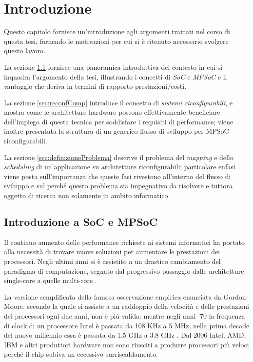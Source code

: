 \chapter{Introduzione}
\label{chap:intro}
\vspace{1cm}
Questo capitolo fornisce un'introduzione agli argomenti trattati nel corso di questa
tesi, fornendo le motivazioni per cui si \`e ritenuto necessario svolgere questo
lavoro.

La sezione \ref{sec:introSoC} fornisce una panoramica introduttiva del contesto in cui si
inquadra l'argomento della tesi, illustrando i concetti di \emph{\acl{SoC}} e
\emph{\acl{MPSoC}} e il vantaggio che deriva in termini di rapporto prestazioni/costi.

La sezione \ref{sec:reconfComp} introduce il concetto di \emph{sistemi riconfigurabili},
e mostra come le architetture hardware possono effettivamente beneficiare dell'impiego
di questa tecnica per soddisfare i requisiti di performance; viene inoltre presentata
la struttura di un generico flusso di sviluppo per \acs{MPSoC} riconfigurabili.

La sezione \ref{sec:definizioneProblema} descrive il problema del \emph{mapping} e dello
\emph{scheduling} di un'applicazione su architetture riconfigurabili; particolare
enfasi viene posta sull'importanza che queste fasi rivestono all'interno del
flusso di sviluppo e sul perch\'e questo problema sia impegnativo da risolvere
e tuttora oggetto di ricerca non solamente in ambito informatico.

\newpage

\section[Introduzione a \acs{SoC} e \ac{MPSoC}]{Introduzione a \acs{SoC} e \ac{MPSoC}}
\label{sec:introSoC}
Il continuo aumento delle performance richieste ai sistemi informatici ha portato alla necessit\`a
di trovare nuove soluzioni per aumentare le prestazioni dei processori. Negli ultimi anni si \`e
assistito a un drastico cambiamento del paradigma di computazione, segnato dal progressivo passaggio
dalle architetture single-core a quelle multi-core \cite{SingleCoreToMultiCore}.

La versione semplificata della famosa osservazione empirica enunciata da Gordon Moore, secondo la quale
si assiste a un raddoppio della velocit\`a e delle prestazioni dei processori ogni due anni, non \`e
pi\`u valida: mentre negli anni '70 la frequenza di clock di un processore Intel \`e passata da 108 KHz a
5 MHz, nella prima decade del nuovo millennio essa \`e passata da 1.5 GHz
a 3.8 GHz \cite{IntelTimeline}. Dal 2006 Intel, AMD, IBM e altri produttori hardware non sono riusciti a produrre
processori pi\`u veloci perch\'e il chip subiva un eccessivo surriscaldamento.

